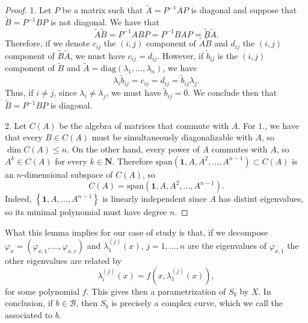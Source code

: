 \documentclass[12pt,a4paper]{book}
\theoremstyle{definition} \newtheorem{defn}[thm]{Definition}
\theoremstyle{definition} \newtheorem{ejemplo}[thm]{Example}
\theoremstyle{remark} \newtheorem{rem}[thm]{Remark}
\def\BB{\mathscr{B}}
\def\NN{\mathbf{N}}
\def\id{\mathbf{1}}
\let\emph\relax
\begin{document}
  \begin{proof}
    1. Let $P$ be a matrix such that $\tilde{A}=P^{-1}A P$ is diagonal and suppose that $\tilde{B}=P^{-1} B P$ is not diagonal. We have that
    \begin{equation*}
      \tilde{A}\tilde{B} = P^{-1} AB P = P^{-1} BA P = \tilde{B} \tilde{A}.
    \end{equation*}
    Therefore, if we denote $c_{ij}$ the $(i,j)$ component of $\tilde{A}\tilde{B}$ and $d_{ij}$ the $(i,j)$ component of $\tilde{B}\tilde{A}$, we must have $c_{ij} = d_{ij}$. However, if $\tilde{b}_{ij}$ is the $(i,j)$ component of $\tilde{B}$ and $\tilde{A} = \mathrm{diag}(\lambda_1,\dots,\lambda_n)$, we have
    \begin{equation*}
      \lambda_i \tilde{b}_{ij}=c_{ij}=d_{ij}=\tilde{b}_{ij} \lambda_j.
    \end{equation*}
    Thus, if $i \neq j$, since $\lambda_i \neq \lambda_j$, we must have $\tilde{b}_{ij}=0$. We conclude then that $\tilde{B}=P^{-1}BP$ is diagonal.

    2. Let $C(A)$ be the algebra of matrices that commute with $A$. For $1.$, we have that every $B \in C(A)$ must be simultaneously diagonalizable with $A$, so $\dim C(A) \leq n$. On the other hand, every power of $A$ commutes with $A$, so $A^k \in C(A)$ for every $k \in \NN$. Therefore $\mathrm{span}(\id,A,A^2,\dots,A^{n-1}) \subset C(A)$ is an $n$-dimensional subspace of $C(A)$, so $$C(A)=\mathrm{span}(\id, A,A^2,\dots,A^{n-1}).$$
    Indeed, $\left\{ \id,A,\dots,A^{n-1} \right\}$ is linearly independent since $A$ has distint eigenvalues, so its minimal polynomial must have degree $n$.
 \end{proof}

 What this lemma implies for our case of study is that, if we decompose $\varphi_x=(\varphi_{x,1},\dots,\varphi_{x,r})$ and $\lambda_1^{(j)}(x)$, $j=1,\dots,n$ are the eigenvalues of $\varphi_{x,1}$ the other eigenvalues are related by 
 \begin{equation*}
   \lambda^{(j)}_i(x)= f(x,\lambda^{(j)}_1(x)),
 \end{equation*}
 for some polynomial $f$. This gives then a parametrization of $S_b$ by $X$. In conclusion, if $b\in \BB$, then $S_b$ is precisely a complex curve, which we call the \emph{spectral curve} associated to $b$. 
\end{document}

